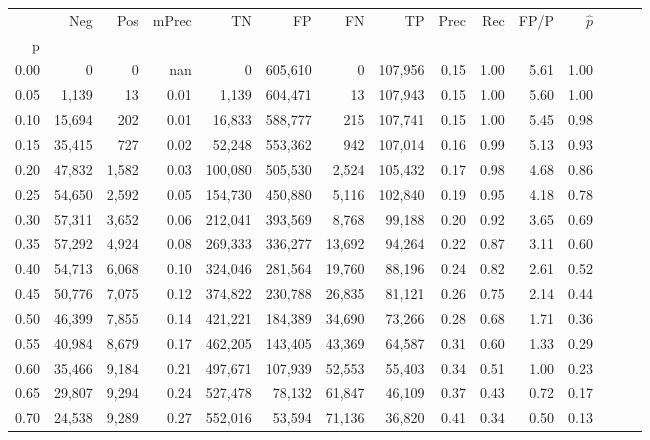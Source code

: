 \begin{tabular}{rrrrrrrrrrrrrrr}
\toprule
{} &     Neg &    Pos & mPrec &       TN &       FP &       FN &       TP &  Prec &   Rec &  FP/P & $\hat{p}$ \\
p    &         &        &       &          &          &          &          &       &       &       &           \\
\midrule
0.00 &       0 &      0 &   nan &        0 &  605,610 &        0 &  107,956 &  0.15 &  1.00 &  5.61 &      1.00 \\
0.05 &   1,139 &     13 &  0.01 &    1,139 &  604,471 &       13 &  107,943 &  0.15 &  1.00 &  5.60 &      1.00 \\
0.10 &  15,694 &    202 &  0.01 &   16,833 &  588,777 &      215 &  107,741 &  0.15 &  1.00 &  5.45 &      0.98 \\
0.15 &  35,415 &    727 &  0.02 &   52,248 &  553,362 &      942 &  107,014 &  0.16 &  0.99 &  5.13 &      0.93 \\
0.20 &  47,832 &  1,582 &  0.03 &  100,080 &  505,530 &    2,524 &  105,432 &  0.17 &  0.98 &  4.68 &      0.86 \\
0.25 &  54,650 &  2,592 &  0.05 &  154,730 &  450,880 &    5,116 &  102,840 &  0.19 &  0.95 &  4.18 &      0.78 \\
0.30 &  57,311 &  3,652 &  0.06 &  212,041 &  393,569 &    8,768 &   99,188 &  0.20 &  0.92 &  3.65 &      0.69 \\
0.35 &  57,292 &  4,924 &  0.08 &  269,333 &  336,277 &   13,692 &   94,264 &  0.22 &  0.87 &  3.11 &      0.60 \\
0.40 &  54,713 &  6,068 &  0.10 &  324,046 &  281,564 &   19,760 &   88,196 &  0.24 &  0.82 &  2.61 &      0.52 \\
0.45 &  50,776 &  7,075 &  0.12 &  374,822 &  230,788 &   26,835 &   81,121 &  0.26 &  0.75 &  2.14 &      0.44 \\
0.50 &  46,399 &  7,855 &  0.14 &  421,221 &  184,389 &   34,690 &   73,266 &  0.28 &  0.68 &  1.71 &      0.36 \\
0.55 &  40,984 &  8,679 &  0.17 &  462,205 &  143,405 &   43,369 &   64,587 &  0.31 &  0.60 &  1.33 &      0.29 \\
0.60 &  35,466 &  9,184 &  0.21 &  497,671 &  107,939 &   52,553 &   55,403 &  0.34 &  0.51 &  1.00 &      0.23 \\
0.65 &  29,807 &  9,294 &  0.24 &  527,478 &   78,132 &   61,847 &   46,109 &  0.37 &  0.43 &  0.72 &      0.17 \\
0.70 &  24,538 &  9,289 &  0.27 &  552,016 &   53,594 &   71,136 &   36,820 &  0.41 &  0.34 &  0.50 &      0.13 \\

\end{tabular}
